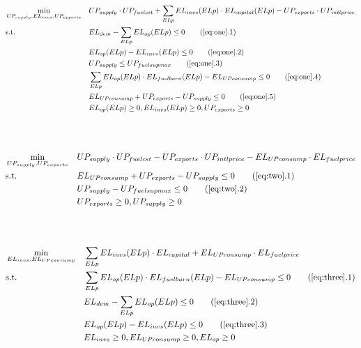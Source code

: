 \documentclass{article}
\begin{document}
    \begin{align}
        & \min_{UP_{supply},EL_{invs},UP_{exports}} & & UP_{supply}\cdot UP_{fuelcst}+\sum_{ELp}EL_{invs}(ELp)\cdot EL_{capital}(ELp)-UP_{exports}\cdot UP_{intlprice} \label{eq:one}\\
        & \text{s.t.} & &  EL_{dem} - \sum_{ELp}EL_{op}(ELp) \leq 0 \tag{\ref{eq:one}.1}\\
        & & &  EL_{op}(ELp) - EL_{invs}(ELp) \leq 0 \tag{\ref{eq:one}.2}\\
        & & &  UP_{supply} \leq UP_{fuelsupmax} \tag{\ref{eq:one}.3}\\
        & & & \sum_{ELp}EL_{op}(ELp)\cdot EL_{fuelburn}(ELp) - EL_{UPconsump} \leq 0 \tag{\ref{eq:one}.4}\\
        & & & EL_{UPconsump}+UP_{exports}-UP_{supply} \leq 0 \tag{\ref{eq:one}.5}\\
        & & & EL_{op}(ELp)\geq 0, EL_{invs}(ELp)\geq 0, UP_{exports}\geq 0\nonumber
    \end{align}
    \\
    \\
    \begin{align}
        & \min_{UP_{supply},UP_{exports}} & & UP_{supply}\cdot UP_{fuelcst}-UP_{exports}\cdot UP_{intlprice}-EL_{UPconsump}\cdot EL_{fuelprice} \label{eq:two}\\
        & \text{s.t.} & &  EL_{UPconsump}+UP_{exports}-UP_{supply} \leq 0 \tag{\ref{eq:two}.1}\\
        & & & UP_{supply} - UP_{fuelsupmax} \leq 0 \tag{\ref{eq:two}.2}\\
        & & & UP_{exports}\geq 0, UP_{supply} \geq 0\nonumber
    \end{align}
    \\
    \\
    \begin{align}
        & \min_{EL_{invs},EL_{UPconsump}} & & \sum_{ELp}EL_{invs}(ELp)\cdot EL_{capital} + EL_{UPconsump}\cdot EL_{fuelprice} \label{eq:three}\\
        & \text{s.t.} & &  \sum_{ELp}EL_{op}(ELp)\cdot EL_{fuelburn}(ELp) - EL_{UPconsump} \leq 0 \tag{\ref{eq:three}.1}\\
        & & & EL_{dem} - \sum_{ELp}EL_{op}(ELp) \leq 0 \tag{\ref{eq:three}.2}\\
        & & & EL_{op}(ELp) - EL_{invs}(ELp) \leq 0 \tag{\ref{eq:three}.3}\\
        & & & EL_{invs}\geq 0, EL_{UPconsump} \geq 0, EL_{op} \geq 0\nonumber
    \end{align}
\end{document}
